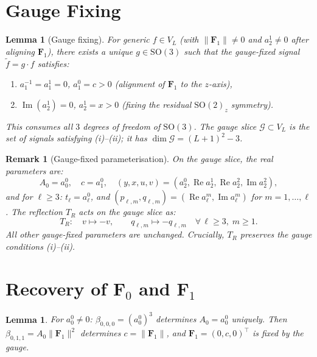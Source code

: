 \documentclass[11pt]{article}
\newtheorem{lemma}[theorem]{Lemma}
\newtheorem{remark}[theorem]{Remark}
\DeclareMathOperator{\im}{Im}
\newcommand{\SO}{\mathrm{SO}}
\newcommand{\norm}[1]{\lVert #1 \rVert}
\begin{document}
\section{Gauge Fixing}

\begin{lemma}[Gauge fixing]\label{lem:gauge}
For generic $f \in V_L$ (with $\norm{\mathbf{F}_1} \ne 0$ and $a_2^1 \ne 0$
after aligning $\mathbf{F}_1$), there exists a unique $g \in \SO(3)$ such that
the gauge-fixed signal $\tilde{f} = g \cdot f$ satisfies:
\begin{enumerate}[nosep,label=(\roman*)]
\item $a_1^{-1} = a_1^1 = 0$, \quad $a_1^0 = c > 0$ \quad
  (alignment of $\mathbf{F}_1$ to the $z$-axis),
\item $\im(a_2^1) = 0$, \quad $a_2^1 = x > 0$ \quad
  (fixing the residual $\SO(2)_z$ symmetry).
\end{enumerate}
This consumes all $3$ degrees of freedom of $\SO(3)$.
The gauge slice $\mathcal{G} \subset V_L$ is the set of signals
satisfying (i)--(ii); it has $\dim\mathcal{G} = (L+1)^2 - 3$.
\end{lemma}

\begin{remark}[Gauge-fixed parameterisation]\label{rem:gauge-param}
On the gauge slice, the real parameters are:
\[
  A_0 = a_0^0, \quad c = a_1^0, \quad
  (y, x, u, v) = (a_2^0, \operatorname{Re}a_2^1, \operatorname{Re}a_2^2, \im a_2^2),
\]
and for $\ell \ge 3$: $t_\ell = a_\ell^0$, and
$(p_{\ell,m}, q_{\ell,m}) = (\operatorname{Re}a_\ell^m, \im a_\ell^m)$ for $m = 1,\ldots,\ell$.
The reflection $T_R$ acts on the gauge slice as:
\begin{equation}\label{eq:TR-action}
  T_R: \quad v \mapsto -v, \qquad
  q_{\ell,m} \mapsto -q_{\ell,m} \quad \forall\, \ell \ge 3, \; m \ge 1.
\end{equation}
All other gauge-fixed parameters are unchanged.
Crucially, $T_R$ preserves the gauge conditions (i)--(ii).
\end{remark}

\section{Recovery of $\mathbf{F}_0$ and $\mathbf{F}_1$}

\begin{lemma}\label{lem:F0F1}
For $a_0^0 \ne 0$:
$\beta_{0,0,0} = (a_0^0)^3$ determines $A_0 = a_0^0$ uniquely.
Then $\beta_{0,1,1} = A_0 \norm{\mathbf{F}_1}^2$ determines
$c = \norm{\mathbf{F}_1}$, and $\mathbf{F}_1 = (0, c, 0)^\top$
is fixed by the gauge.
\end{lemma}
\end{document}
